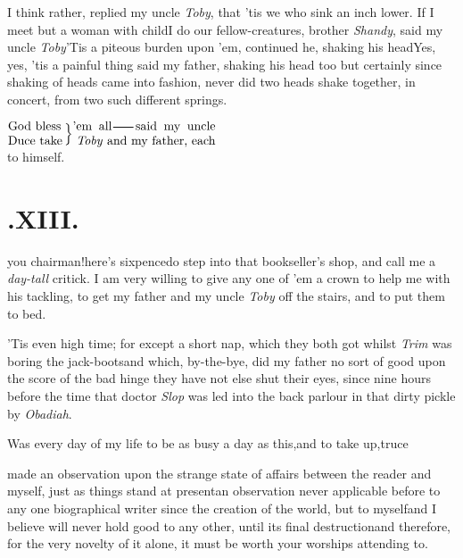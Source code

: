 \documentclass{article}
\begin{document}
I think rather, replied my uncle \textit{Toby}, that ’tis we who sink an inch lower.\tsh
If I meet but a woman with child\tsk I do
our fellow-creatures, brother \textit{Shandy},\break
said my uncle \textit{Toby}\tsk ’Tis a
piteous burden upon ’em, continued he, shaking his head\tsk Yes, yes, ’tis a painful
thing\tsk\break
said my father, shaking his head too\tsk\break
but certainly since shaking of heads
came into fashion, never did two heads shake together, in concert, from two such
different springs.

\indent$\vcenter{\halign{#\rlap{\phantom{y}}\hss\cr
God bless\cr
Duce take\cr}}\,\Big\}
\vcenter{\halign{#\cr
’em all\tsk said my uncle\cr
\;\textit{Toby} and my father, each\cr}}$
\\[4pt] to himself.

\smallskip
\section{.\enspace XIII.} 

\tsk you chairman!\tsk here’s\break
sixpence\tsk do step into that book\-seller’s shop, and call me a
\textit{day-tall}\break
critick. I am very willing to give any one of ’em a crown to help me
with his tackling, to get my father and my uncle \textit{Toby} off
the stairs, and to put them to bed.\tsk

\tsk ’Tis even high time; for except a short nap, which
they both got whilst \textit{Trim} was boring the
jack-boots\tsk and which, by-the-bye, did my father no sort of
good upon the score of the bad hinge\break
\tsk they have not else shut their eyes, since
nine hours before the time that doctor \textit{Slop} was led into the
back parlour in that dirty pickle by \textit{Obadiah}.

Was every day of my life to be as\break
busy a day as this,\tsk and to take up,\tsk truce\tsk

made an observation upon the strange state of affairs between the reader and myself,
just as things stand at present\tsk an observation never
applicable before to any one biographical writer since the creation
of the world, but to myself\tsk and I believe will never hold
good to any other, until its final destruction\tsk\break and therefore,
for the very novelty of it alone, it must be worth your worships
attending to.
\end{document}

